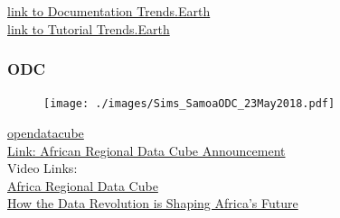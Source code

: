 \begin{frame}

\centering
\href{ http://trends.earth/docs/en/}{link to Documentation Trends.Earth}\\
\href{http://trends.earth/docs/en/documentation/info.html}{link to  Tutorial Trends.Earth}

\end{frame}

\begin{frame}
  \frametitle{ODC}
\vspace{-1.5cm}
\begin{figure}[ht]
	\centering
	\texttt{[image: ./images/Sims\_SamoaODC\_23May2018.pdf]}
\end{figure}
\href{https://www.opendatacube.org/}{opendatacube}\\
\href{https://www.earthobservations.org/documents/meetings/201805_rapp_sdg_odc/201805_odc_announcement.pdf}{Link: African Regional Data Cube Announcement}\\
\vspace{0.5cm}
Video Links:\\ 
\href{https://www.youtube.com/watch?v=tEeT5VH7qVc}{Africa Regional Data Cube}\\
\href{https://www.youtube.com/watch?v=exIBPwtvbiI}
{How the Data Revolution is Shaping Africa's Future}

\end{frame}

